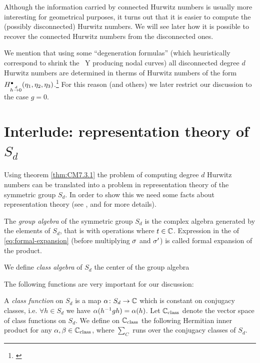 \documentclass[../main/main.tex]{subfiles}
\begin{document}
Although the information carried by connected Hurwitz numbers is usually more interesting for geometrical purposes, it turns out that it is easier to compute the (possibly disconnected) Hurwitz numbers. We will see later how it is possible to recover the connected Hurwitz numbers from the disconnected ones. 

We mention that using some ``degeneration formulas'' (which heuristically correspond to shrink the \rs\ Y producing nodal curves) all disconnected degree $d$ Hurwitz numbers are determined in therms of Hurwitz numbers of the form $H^\bullet_{h\overset d\to0}(\eta_1,\eta_2,\eta_3)$.\footnote{\cite[Thm. 7.5.3]{CM}} For this reason (and others) we later restrict our discussion to the case $g=0$. 

\section{Interlude: representation theory of $S_d$}

Using theorem \ref{thm:CM7.3.1} the problem of computing degree $d$ Hurwitz numbers can be translated into a problem in representation theory of the symmetric group $S_d$. In order to show this we need some facts about representation theory (see \cite[Part I]{FH}, \cite{M} and \cite[§8]{CM} for more details). 

\begin{definition}
	The \emph{group algebra} of the symmetric group $S_d$ is the complex algebra generated by the elements of $S_d$, that is
	with operations
	where $t\in\mathbb C$. Expression in the \rhs of \eqref{eq:formal-expansion} (before multiplying $\sigma$ and $\sigma'$) is called formal expansion of the product.
	
	We define \emph{class algebra} of $S_d$ the center of the group algebra
\end{definition}

The following functions are very important for our discussion:

\begin{definition}
	A \emph{class function} on $S_d$ is a map $\alpha\colon S_d\to\mathbb C$ which is constant on conjugacy classes, i.e. $\forall h\in S_d$ we have $\alpha(h^{-1}gh)=\alpha(h)$. Let $\mathbb C_{\text{class}}$ denote the vector space of class functions on $S_d$. We define on $\mathbb C_{\text{class}}$ the following Hermitian inner product
 	for any $\alpha,\beta\in \mathbb C_{\text{class}}$, where $\sum_C$ runs over the conjugacy classes of $S_d$. 
\end{definition}
\end{document}

